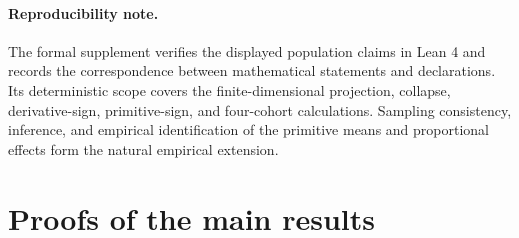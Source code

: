 \documentclass[11pt]{article}
\begin{document}
\paragraph{Reproducibility note.}
The formal supplement verifies the displayed population claims in Lean 4 and records the correspondence between mathematical statements and declarations. Its deterministic scope covers the finite-dimensional projection, collapse, derivative-sign, primitive-sign, and four-cohort calculations. Sampling consistency, inference, and empirical identification of the primitive means and proportional effects form the natural empirical extension.


\section{Proofs of the main results}\label{sec:deferred-proofs}
\end{document}
